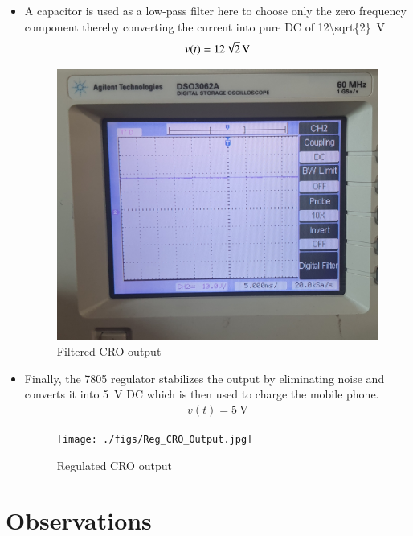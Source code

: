 \documentclass[journal,12pt,twocolumn]{IEEEtran}
\numberwithin{equation}{section}
\numberwithin{figure}{section}
\begin{document}
\begin{itemize}
		\item A capacitor is used as a low-pass filter here to choose only the zero frequency component thereby converting the current into pure DC of \SI[parse-numbers=false]{12\sqrt{2}}{\volt}
		\begin{align}
			v(t) = \SI[parse-numbers=false]{12\sqrt{2}}{\volt}
		\end{align}
		\begin{figure}[!ht]
			\centering
			\includegraphics[width=\columnwidth]{./figs/DC_18V.jpg}
			\caption{Filtered CRO output}
			\label{fig-filter}	
		\end{figure}
		
		\item Finally, the 7805 regulator stabilizes the output by eliminating noise and converts it into \SI{5}{\volt} DC which is then used to charge the mobile phone.
		\begin{align}
			v(t) = \SI{5}{\volt}
		\end{align}
		\begin{figure}[!ht]
			\centering
			\texttt{[image: ./figs/Reg\_CRO\_Output.jpg]}
			\caption{Regulated CRO output}
			\label{fig-regulator}	
		\end{figure}

	\end{itemize}
	
	\section{Observations}
	
\end{document}
